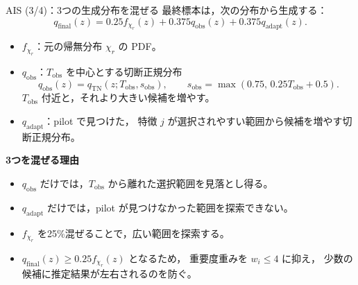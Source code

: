\documentclass[aspectratio=169,11pt]{beamer}
\begin{document}
\begin{frame}{AIS (3/4)：3つの生成分布を混ぜる}
  \footnotesize
  \setlength{\abovedisplayskip}{3pt}
  \setlength{\belowdisplayskip}{3pt}
  最終標本は，次の分布から生成する：
  \[
    q_{\mathrm{final}}(z)
    =0.25f_{\chi_r}(z)
     +0.375q_{\mathrm{obs}}(z)
     +0.375q_{\mathrm{adapt}}(z).
  \]

  \begin{itemize}
    \setlength{\itemsep}{0.10cm}
    \item $f_{\chi_r}$：元の帰無分布 $\chi_r$ の PDF。
    \item $q_{\mathrm{obs}}$：$T_{\mathrm{obs}}$ を中心とする切断正規分布
      \[
        q_{\mathrm{obs}}(z)=q_{\mathrm{TN}}(z;T_{\mathrm{obs}},s_{\mathrm{obs}}),
        \qquad
        s_{\mathrm{obs}}=\max(0.75,\,0.25T_{\mathrm{obs}}+0.5).
      \]
      $T_{\mathrm{obs}}$ 付近と，それより大きい候補を増やす。
    \item $q_{\mathrm{adapt}}$：pilot で見つけた，
      特徴 $j$ が選択されやすい範囲から候補を増やす切断正規分布。
  \end{itemize}

  \textbf{3つを混ぜる理由}
  \begin{itemize}
    \setlength{\itemsep}{0.08cm}
    \item $q_{\mathrm{obs}}$ だけでは，$T_{\mathrm{obs}}$ から離れた選択範囲を見落とし得る。
    \item $q_{\mathrm{adapt}}$ だけでは，pilot が見つけなかった範囲を探索できない。
    \item $f_{\chi_r}$ を25\%混ぜることで，広い範囲を探索する。
    \item $q_{\mathrm{final}}(z)\ge0.25f_{\chi_r}(z)$ となるため，
      重要度重みを $w_i\le4$ に抑え，
      少数の候補に推定結果が左右されるのを防ぐ。
  \end{itemize}
\end{frame}
\end{document}
